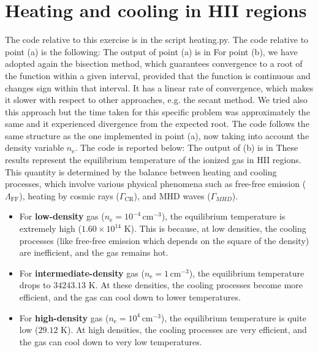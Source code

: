 \section{Heating and cooling in HII regions}
The code relative to this exercise is in the script heating.py. The code relative to point (a) is the following:  The output of point (a) is in  
For point (b), we have adopted again the bisection method, which guarantees convergence to a root of the function within a given interval, provided that the function is continuous and changes sign within that interval. It has a linear rate of convergence, which makes it slower with respect to other approaches, e.g. the secant method. We tried also this approach but the time taken for this specific problem was approximately the same and it experienced divergence from the expected root. The code follows the same structure as the one implemented in point (a), now taking into account the density variable $n_\text{e}$. The code is reported below: 
The output of (b) is in 
These results represent the equilibrium temperature of the ionized gas in HII regions. This quantity is determined by the balance between heating and cooling processes, which involve various physical phenomena such as free-free emission ($\Lambda_\text{FF}$), heating by cosmic rays ($\Gamma_\text{CR}$), and MHD waves ($\Gamma_{MHD}$).
\begin{itemize}
  \item For \textbf{low-density} gas ($n_\text{e} = 10^{-4} \, \text{cm}^{-3}$), the equilibrium temperature is extremely high ($1.60 \times 10^{14}$ K). This is because, at low densities, the cooling processes (like free-free emission which depends on the square of the density) are inefficient, and the gas remains hot.
  \item For \textbf{intermediate-density} gas ($n_\text{e} = 1 \, \text{cm}^{-3}$), the equilibrium temperature drops to $34243.13$ K. At these densities, the cooling processes become more efficient, and the gas can cool down to lower temperatures.
  \item For \textbf{high-density} gas ($n_\text{e} = 10^{4} \, \text{cm}^{-3}$), the equilibrium temperature is quite low ($29.12$ K). At high densities, the cooling processes are very efficient, and the gas can cool down to very low temperatures.
\end{itemize}


